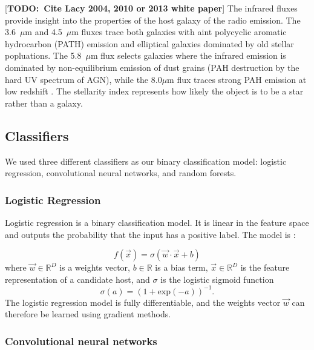 \documentclass[fleqn,usenatbib,usedcolumn]{mnras}
\newcommand{\todo}[1]{ {\color{red}[{\bf TODO:~{#1}}]} }
\begin{document}
    \todo{Cite Lacy 2004, 2010 or 2013 white paper}
    The infrared fluxes provide insight into the properties of the host galaxy
    of the radio emission. The 3.6~$\mu$m and 4.5~$\mu$m fluxes trace both
    galaxies with aint polycyclic aromatic hydrocarbon (PATH) emission and
    elliptical galaxies dominated by old stellar popluations. The 5.8~$\mu$m
    flux selects galaxies where the infrared emission is dominated by
    non-equilibrium emission of dust grains (PAH destruction by the hard UV
    spectrum of AGN), while the 8.0$\mu$m flux traces strong PAH emission at
    low redshift \citep{citeneeded}. The stellarity index represents how
    likely the object is to be a star rather than a galaxy.

  \subsection{Classifiers}\label{sec:classifiers}

    We used three different classifiers as our binary classification model:
    logistic regression, convolutional neural networks, and random forests.

    \subsubsection{Logistic Regression}
    \label{sec:logistic-regression}
      Logistic regression is a binary classification model. It is linear in the
      feature space and outputs the probability that the input has a positive
      label. The model is \citep{bishop06ml}:

      \begin{equation}
          f(\vec x) = \sigma(\vec w \cdot \vec x + b)
      \end{equation}
      where $\vec w \in \mathbb{R}^D$ is a weights vector,
      $b \in \mathbb{R}$ is a bias term, $\vec x \in \mathbb{R}^D$ is the
      feature representation of a candidate host, and $\sigma$ is the
      logistic sigmoid function \begin{equation}
          \sigma(a) = (1 + \mathrm{exp}(-a))^{-1}.
      \end{equation}%
      The logistic regression model is fully differentiable, and the weights
      vector $\vec w$ can therefore be learned using gradient methods.

    \subsubsection{Convolutional neural networks}
    \label{sec:convolutional-neural-networks}
\end{document}
